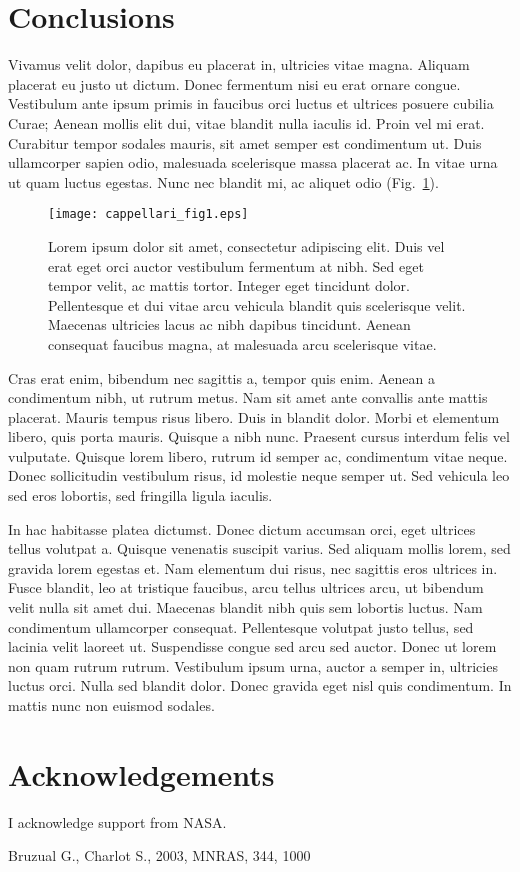 \documentclass{iau}
\newcommand{\mnras}{MNRAS}       %
\begin{document}
\section{Conclusions}

Vivamus velit dolor, dapibus eu placerat in, ultricies vitae magna. Aliquam placerat eu justo ut dictum. Donec fermentum nisi eu erat ornare congue. Vestibulum ante ipsum primis in faucibus orci luctus et ultrices posuere cubilia Curae; Aenean mollis elit dui, vitae blandit nulla iaculis id. Proin vel mi erat. Curabitur tempor sodales mauris, sit amet semper est condimentum ut. Duis ullamcorper sapien odio, malesuada scelerisque massa placerat ac. In vitae urna ut quam luctus egestas. Nunc nec blandit mi, ac aliquet odio (Fig.~\ref{fig:fig1}).


\begin{figure}
\centering
\texttt{[image: cappellari\_fig1.eps]} 
\caption{Lorem ipsum dolor sit amet, consectetur adipiscing elit. Duis vel erat eget orci auctor vestibulum fermentum at nibh. Sed eget tempor velit, ac mattis tortor. Integer eget tincidunt dolor. Pellentesque et dui vitae arcu vehicula blandit quis scelerisque velit. Maecenas ultricies lacus ac nibh dapibus tincidunt. Aenean consequat faucibus magna, at malesuada arcu scelerisque vitae.}\label{fig:fig1}
\end{figure}

Cras erat enim, bibendum nec sagittis a, tempor quis enim. Aenean a condimentum nibh, ut rutrum metus. Nam sit amet ante convallis ante mattis placerat. Mauris tempus risus libero. Duis in blandit dolor. Morbi et elementum libero, quis porta mauris. Quisque a nibh nunc. Praesent cursus interdum felis vel vulputate. Quisque lorem libero, rutrum id semper ac, condimentum vitae neque. Donec sollicitudin vestibulum risus, id molestie neque semper ut. Sed vehicula leo sed eros lobortis, sed fringilla ligula iaculis.

In hac habitasse platea dictumst. Donec dictum accumsan orci, eget ultrices tellus volutpat a. Quisque venenatis suscipit varius. Sed aliquam mollis lorem, sed gravida lorem egestas et. Nam elementum dui risus, nec sagittis eros ultrices in. Fusce blandit, leo at tristique faucibus, arcu tellus ultrices arcu, ut bibendum velit nulla sit amet dui. Maecenas blandit nibh quis sem lobortis luctus. Nam condimentum ullamcorper consequat. Pellentesque volutpat justo tellus, sed lacinia velit laoreet ut. Suspendisse congue sed arcu sed auctor. Donec ut lorem non quam rutrum rutrum. Vestibulum ipsum urna, auctor a semper in, ultricies luctus orci. Nulla sed blandit dolor. Donec gravida eget nisl quis condimentum. In mattis nunc non euismod sodales.

\section*{Acknowledgements}

\noindent
I acknowledge support from NASA.

\begin{thebibliography}{99}

{Bruzual} G., {Charlot} S., 2003, \mnras, 344, 1000

\end{thebibliography}
\end{document}
